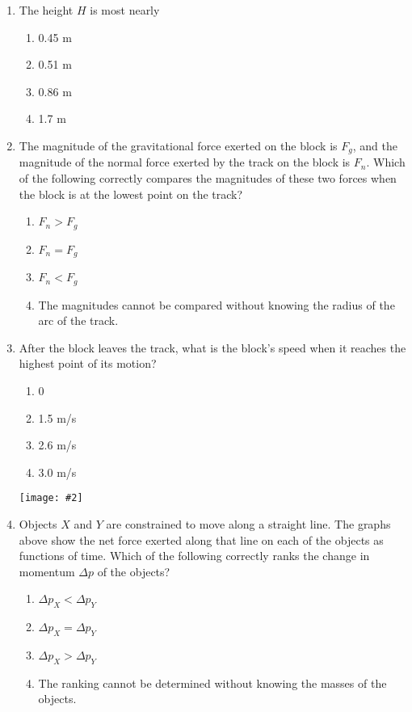 \documentclass[11pt]{article}
\newcommand{\pic}[2]{\texttt{[image: \#2]}}
\begin{document}
\begin{multicols}{2}
  \begin{enumerate}[leftmargin=18pt,resume]
  \item The height $H$ is most nearly
    \begin{enumerate}[noitemsep,topsep=0pt,leftmargin=18pt,label=(\Alph*)]
    \item 0.45 m
    \item 0.51 m
    \item 0.86 m
    \item 1.7 m
    \end{enumerate}
    \label{first}
    
  \item The magnitude of the gravitational force exerted on the block is $F_g$,
    and the magnitude of the normal force exerted by the track on the block is
    $F_n$. Which of the following correctly compares the magnitudes of these
    two forces when the block is at the lowest point on the track?
    \begin{enumerate}[noitemsep,topsep=0pt,leftmargin=18pt,label=(\Alph*)]
    \item $F_n>F_g$
    \item $F_n=F_g$
    \item $F_n<F_g$
    \item The magnitudes cannot be compared without knowing the radius of the
      arc of the track.
    \end{enumerate}
    
  \item After the block leaves the track, what is the block's speed when it
    reaches the highest point of its motion?
    \begin{enumerate}[noitemsep,topsep=0pt,leftmargin=18pt,label=(\Alph*)]
    \item 0
    \item 1.5 m/s
    \item 2.6 m/s
    \item 3.0 m/s
    \end{enumerate}
    \label{last}
    \columnbreak
    
    \begin{center}
      \pic{.4}{impulses}
    \end{center}
  \item Objects $X$ and $Y$ are constrained to move along a straight line. The
    graphs above show the net force exerted along that line on each of the
    objects as functions of time. Which of the following correctly ranks the
    change in momentum $\Delta p$ of the objects?
    \begin{enumerate}[noitemsep,topsep=0pt,leftmargin=18pt,label=(\Alph*)]
    \item $\Delta p_X < \Delta p_Y$
    \item $\Delta p_X = \Delta p_Y$ 
    \item $\Delta p_X > \Delta p_Y$
    \item The ranking cannot be determined without knowing the masses of the
      objects.
    \end{enumerate}


\end{enumerate}
\end{multicols}
\end{document}
